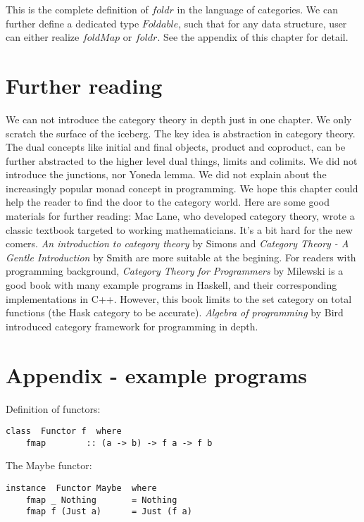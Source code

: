 \documentclass{article}
\begin{document}
This is the complete definition of $foldr$ in the language of categories. We can further define a dedicated type $Foldable$, such that for any data structure, user can either realize $foldMap$ or $foldr$. See the appendix of this chapter for detail.

\section{Further reading}

We can not introduce the category theory in depth just in one chapter. We only scratch the surface of the iceberg. The key idea is abstraction in category theory. The dual concepts like initial and final objects, product and coproduct, can be further abstracted to the higher level dual things, limits and colimits. We did not introduce the junctions, nor Yoneda lemma. We did not explain about the increasingly popular monad concept in programming. We hope this chapter could help the reader to find the door to the category world. Here are some good materials for further reading: Mac Lane, who developed category theory, wrote a classic textbook\cite{Mac-Lane-1998} targeted to working mathematicians. It's a bit hard for the new comers. {\em An introduction to category theory} by Simons\cite{Simmons2011} and {\em Category Theory - A Gentle Introduction} by Smith are more suitable at the begining. For readers with programming background, {\em Category Theory for Programmers} by Milewski\cite{Milewski2018} is a good book with many example programs in Haskell, and their corresponding implementations in C++. However, this book limits to the set category on total functions (the Hask category to be accurate). {\em Algebra of programming} by Bird\cite{Bird97} introduced category framework for programming in depth.


\section{Appendix - example programs}

Definition of functors:

\lstset{frame=single}
\begin{lstlisting}[style=Haskell]
class  Functor f  where
    fmap        :: (a -> b) -> f a -> f b
\end{lstlisting}

The Maybe functor:

\begin{lstlisting}
instance  Functor Maybe  where
    fmap _ Nothing       = Nothing
    fmap f (Just a)      = Just (f a)
\end{lstlisting}
\end{document}
